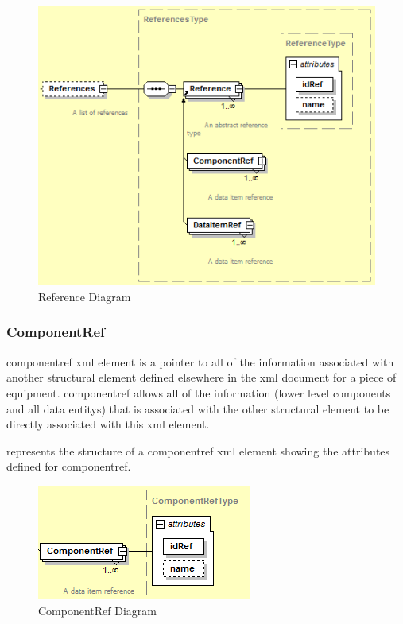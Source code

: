 \begin{figure}[ht]
  \centering
  \includegraphics[width=.75\textwidth]{figures/reference-schema-diagram.png}
  \caption{Reference Diagram}
  \label{fig:reference-schema-diagram}
\end{figure}
\FloatBarrier

\subsubsection{ComponentRef}

\gls{componentref} \gls{xml} element is a pointer to all of the information associated with another \gls{structural element} defined elsewhere in the \gls{xml} document for a piece of equipment.  \gls{componentref} allows all of the information (\gls{lower level} \gls{components} and all \glspl{data entity}) that is associated with the other \gls{structural element} to be directly associated with this \gls{xml} element.

 represents the structure of a \gls{componentref} \gls{xml} element showing the attributes defined for \gls{componentref}.

\begin{figure}[ht]
  \centering
  \includegraphics[width=.5\textwidth]{figures/componentref-schema-diagram.png}
  \caption{ComponentRef Diagram}
  \label{fig:componentref-schema-diagram}
\end{figure}

